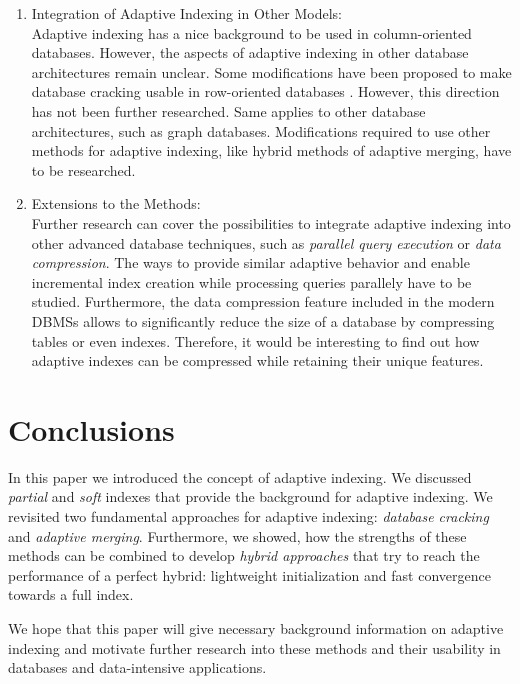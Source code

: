 \documentclass[10pt, conference, compsocconf]{IEEEtran}
\begin{document}
\begin{itemize}
\begin{enumerate}
\item{Integration of Adaptive Indexing in Other Models:}\\
Adaptive indexing has a nice background to be used in column-oriented databases. However, the aspects of adaptive indexing in other database architectures remain unclear. Some modifications have been proposed to make database cracking usable in row-oriented databases \cite{cracking}. However, this direction has not been further researched. Same applies to other database architectures, such as graph databases. Modifications required to use other methods for adaptive indexing, like hybrid methods of adaptive merging, have to be researched.\\
\item{Extensions to the Methods:}\\
Further research can cover the possibilities to integrate adaptive indexing into other advanced database techniques, such as \emph{parallel query execution} or \emph{data compression}. The ways to provide similar adaptive behavior and enable incremental index creation while processing queries parallely have to be studied. Furthermore, the data compression feature included in the modern DBMSs allows to significantly reduce the size of a database by compressing tables or even indexes. Therefore, it would be interesting to find out how adaptive indexes can be compressed while retaining their unique features.
\end{enumerate}
\end{itemize}

\section{Conclusions}
\label{sec:conc}
In this paper we introduced the concept of adaptive indexing. We discussed \emph{partial} and \emph{soft} indexes that provide the background for adaptive indexing. We revisited two fundamental approaches for adaptive indexing: \emph{database cracking} and \emph{adaptive merging}. Furthermore, we showed, how the strengths of these methods can be combined to develop \emph{hybrid approaches} that try to reach the performance of a perfect hybrid: lightweight initialization and fast convergence towards a full index.

We hope that this paper will give necessary background information on adaptive indexing and motivate further research into these methods and their usability in databases and data-intensive applications.
\end{document}
